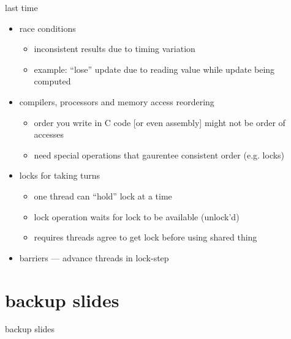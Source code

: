 \date{}
\title{}
\date{}

\begin{frame}
    \titlepage
\end{frame}



\begin{frame}{last time}
    \begin{itemize}
    \item race conditions
        \begin{itemize}
        \item inconsistent results due to timing variation
        \item example: ``lose'' update due to reading value while update being computed
        \end{itemize}
    \item compilers, processors and memory access reordering
        \begin{itemize}
        \item order you write in C code [or even assembly] might not be order of accesses
        \item need special operations that gaurentee consistent order (e.g. locks)
        \end{itemize}
    \item locks for taking turns
        \begin{itemize}
        \item one thread can ``hold'' lock at a time
        \item lock operation waits for lock to be available (unlock'd)
        \item requires threads agree to get lock before using shared thing
        \end{itemize}
    \item barriers --- advance threads in lock-step
    \end{itemize}
\end{frame}






%

\section{backup slides}
\begin{frame}{backup slides}
\end{frame}


